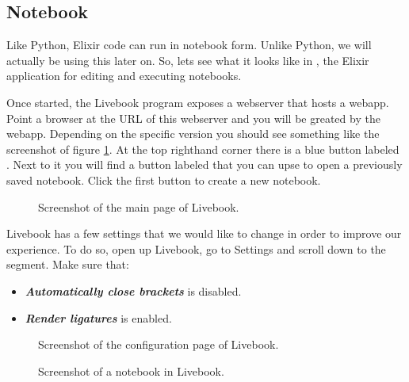 \subsection{Notebook}

Like Python, Elixir code can run in notebook form. Unlike Python, we will actually be using this later on. So, lets see what it looks like in , the Elixir application for editing and executing notebooks.

Once started, the Livebook program exposes a webserver that hosts a webapp. Point a browser at the URL of this webserver and you will be greated by the webapp. Depending on the specific version you should see something like the screenshot of figure \ref{fig:first:elixir:livebook:main}. At the top righthand corner there is a blue button labeled . Next to it you will find a button labeled  that you can upse to open a previously saved notebook. Click the first button to create a new notebook.

\begin{figure}[tbp]
  
  \caption{Screenshot of the main page of Livebook.}
  \label{fig:first:elixir:livebook:main}
\end{figure}

Livebook has a few settings that we would like to change in order to improve our experience. To do so, open up Livebook, go to Settings and scroll down to the  segment. Make sure that:
\begin{itemize}
  \item \textbf{\textsl{Automatically close brackets}} is disabled.
  \item \textbf{\textsl{Render ligatures}} is enabled.
\end{itemize}

\begin{figure}[tbp]
  
  \caption{Screenshot of the configuration page of Livebook.}
  \label{fig:first:elixir:livebook:config}
\end{figure}


\begin{figure}[tbp]
  
  \caption{Screenshot of a notebook in Livebook.}
  \label{fig:first:elixir:livebook:notebook}
\end{figure}

